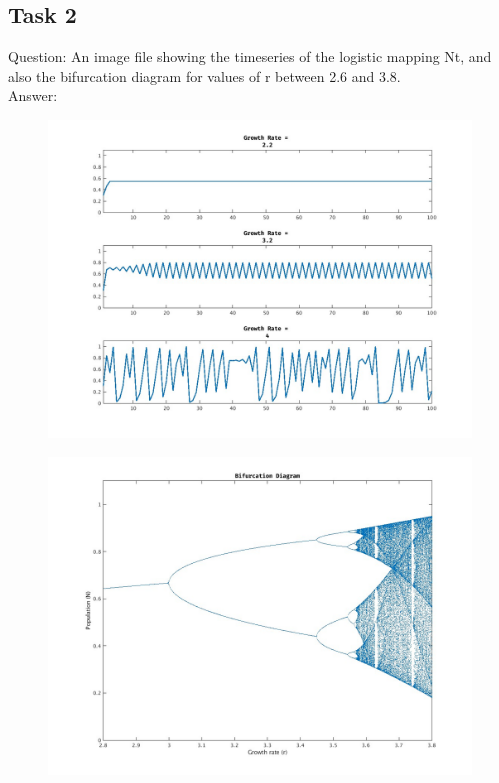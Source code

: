 \documentclass[12pt,a4paper]{report}
\begin{document}
\subsection{Task 2}
Question: An image file showing the timeseries of the logistic mapping Nt, and also the bifurcation diagram for
values of r between 2.6 and 3.8.
\\
Answer:

\begin{figure}[H]
\centering
\includegraphics[width=\textwidth]{../Code/week 3/logisticMapping.jpg} 
\end{figure}

\begin{figure}[H]
\centering
\includegraphics[width=\textwidth]{../Code/week 3/BifurcationDiagram.jpg}  
\end{figure}
\end{document}
